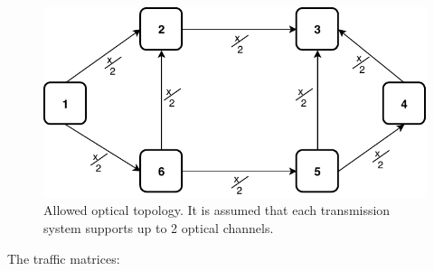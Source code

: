 \begin{figure}[h!]
	\centering
	\includegraphics[width=13cm]{sdf/heuristic/opaque/figures/allowed_optical_ex}
	\caption{Allowed optical topology. It is assumed that each transmission system supports up to 2 optical channels.}
	\label{allowed_optical_ex}
\end{figure}

The traffic matrices:

